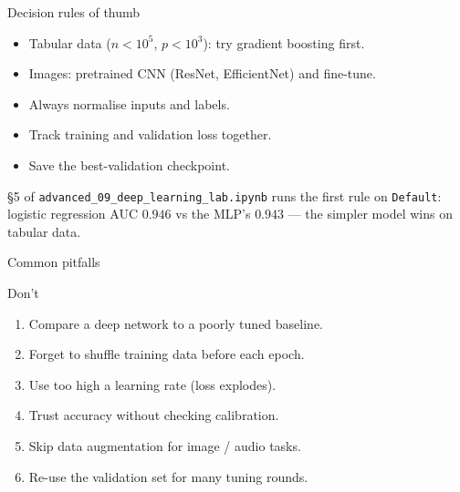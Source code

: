 \documentclass[aspectratio=169,11pt]{beamer}
\begin{document}
\begin{frame}{Decision rules of thumb}
  \begin{itemize}
    \item Tabular data ($n < 10^5$, $p < 10^3$): try gradient
          boosting first.
    \item Images: pretrained CNN (ResNet, EfficientNet) and
          fine-tune.
    \item Always normalise inputs and labels.
    \item Track training and validation loss together.
    \item Save the best-validation checkpoint.
  \end{itemize}
  \begin{labnote}
    \S5 of \texttt{advanced\_09\_deep\_learning\_lab.ipynb} runs the first rule on \texttt{Default}:
    logistic regression AUC $0.946$ vs the MLP's $0.943$ --- the simpler model wins
    on tabular data.
  \end{labnote}
\end{frame}

\begin{frame}{Common pitfalls}
  \begin{alertblock}{Don't}
    \begin{enumerate}
      \item Compare a deep network to a poorly tuned baseline.
      \item Forget to shuffle training data before each epoch.
      \item Use too high a learning rate (loss explodes).
      \item Trust accuracy without checking calibration.
      \item Skip data augmentation for image / audio tasks.
      \item Re-use the validation set for many tuning rounds.
    \end{enumerate}
  \end{alertblock}
\end{frame}
\end{document}
